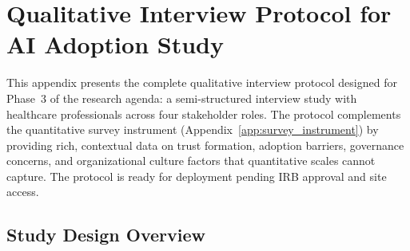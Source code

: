 
\section{Qualitative Interview Protocol for AI Adoption Study}
\label{app:interview_protocol}

This appendix presents the complete qualitative interview protocol designed for Phase~3 of the research agenda: a semi-structured interview study with healthcare professionals across four stakeholder roles. The protocol complements the quantitative survey instrument (Appendix~\ref{app:survey_instrument}) by providing rich, contextual data on trust formation, adoption barriers, governance concerns, and organizational culture factors that quantitative scales cannot capture. The protocol is ready for deployment pending IRB approval and site access.

\subsection{Study Design Overview}


